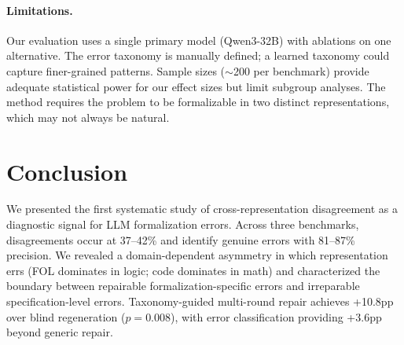 \documentclass[11pt,a4paper]{article}
\begin{document}
\paragraph{Limitations.}
Our evaluation uses a single primary model (Qwen3-32B) with ablations on one alternative. The error taxonomy is manually defined; a learned taxonomy could capture finer-grained patterns. Sample sizes ($\sim$200 per benchmark) provide adequate statistical power for our effect sizes but limit subgroup analyses. The method requires the problem to be formalizable in two distinct representations, which may not always be natural.

\section{Conclusion}
\label{sec:conclusion}

We presented the first systematic study of cross-representation disagreement as a diagnostic signal for LLM formalization errors. Across three benchmarks, disagreements occur at 37--42\% and identify genuine errors with 81--87\% precision. We revealed a domain-dependent asymmetry in which representation errs (FOL dominates in logic; code dominates in math) and characterized the boundary between repairable formalization-specific errors and irreparable specification-level errors. Taxonomy-guided multi-round repair achieves +10.8pp over blind regeneration ($p=0.008$), with error classification providing +3.6pp beyond generic repair.
\end{document}
